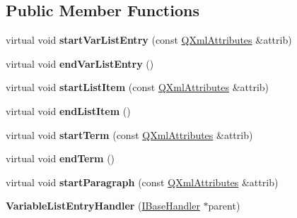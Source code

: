 \subsection*{Public Member Functions}
\begin{DoxyCompactItemize}
\item 
\mbox{\label{class_variable_list_entry_handler_a3138e2c39ca79e885ffcbf389cc73345}} 
virtual void {\bfseries start\+Var\+List\+Entry} (const \mbox{\hyperlink{class_q_xml_attributes}{Q\+Xml\+Attributes}} \&attrib)
\item 
\mbox{\label{class_variable_list_entry_handler_aacc276103a2f1dc3827addd8dd18ecd0}} 
virtual void {\bfseries end\+Var\+List\+Entry} ()
\item 
\mbox{\label{class_variable_list_entry_handler_a05b03ee398629c32421508d0d83b5e65}} 
virtual void {\bfseries start\+List\+Item} (const \mbox{\hyperlink{class_q_xml_attributes}{Q\+Xml\+Attributes}} \&attrib)
\item 
\mbox{\label{class_variable_list_entry_handler_aecde29efdba1024b1e16a1ceee0a51c0}} 
virtual void {\bfseries end\+List\+Item} ()
\item 
\mbox{\label{class_variable_list_entry_handler_adf20801d540afe8ba4f54e55d203a1a8}} 
virtual void {\bfseries start\+Term} (const \mbox{\hyperlink{class_q_xml_attributes}{Q\+Xml\+Attributes}} \&attrib)
\item 
\mbox{\label{class_variable_list_entry_handler_a35bba5f63b8ccc4c336fa78e6659446e}} 
virtual void {\bfseries end\+Term} ()
\item 
\mbox{\label{class_variable_list_entry_handler_a869f46490234257e465b9ad99f01035c}} 
virtual void {\bfseries start\+Paragraph} (const \mbox{\hyperlink{class_q_xml_attributes}{Q\+Xml\+Attributes}} \&attrib)
\item 
\mbox{\label{class_variable_list_entry_handler_a93169f0e359fd1003a548f1e1023db18}} 
{\bfseries Variable\+List\+Entry\+Handler} (\mbox{\hyperlink{class_i_base_handler}{I\+Base\+Handler}} $\ast$parent)

\end{DoxyCompactItemize}
